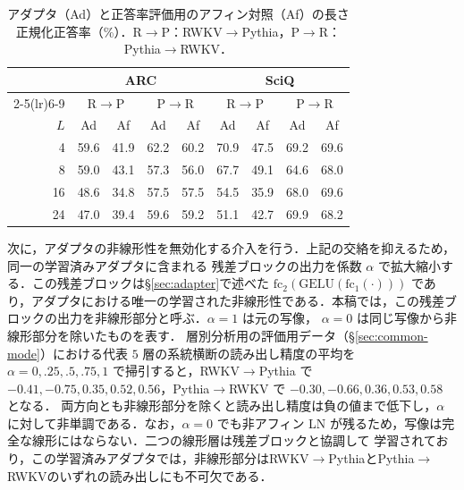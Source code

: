 \documentclass[techrep,noauthor]{ipsj}
\newcommand{\kw}[1]{#1}
\newcommand{\rev}[1]{{\color{blue}#1}}
\newcommand{\revp}[1]{{\color{violet}#1}}
\newcommand{\revy}[1]{{\color{revyellow}#1}}
\newcommand{\RtoP}{\textsf{RWKV$\to$\allowbreak Pythia}}
\newcommand{\PtoR}{\textsf{Pythia$\to$\allowbreak RWKV}}
\begin{document}
\begin{table}[!t]\centering\small
\caption{\rev{アダプタ（Ad）と正答率評価用のアフィン対照（Af）の長さ正規化正答率（\%）．R$\to$P：RWKV$\to$Pythia，P$\to$R：Pythia$\to$RWKV．}}\label{tab:bench}
\setlength{\tabcolsep}{2.4pt}
{\color{blue}
\begin{tabular}{rcccccccc}\toprule
& \multicolumn{4}{c}{\revp{ARC}} & \multicolumn{4}{c}{SciQ}\\
\cmidrule(lr){2-5}\cmidrule(lr){6-9}
& \multicolumn{2}{c}{\textsf{R$\to$P}} & \multicolumn{2}{c}{\textsf{P$\to$R}}
& \multicolumn{2}{c}{\textsf{R$\to$P}} & \multicolumn{2}{c}{\textsf{P$\to$R}}\\
$L$ & Ad & Af & Ad & Af & Ad & Af & Ad & Af\\\midrule
4  & 59.6 & 41.9 & 62.2 & 60.2 & 70.9 & 47.5 & 69.2 & 69.6\\
8  & 59.0 & 43.1 & 57.3 & 56.0 & 67.7 & 49.1 & 64.6 & 68.0\\
16 & 48.6 & 34.8 & 57.5 & 57.5 & 54.5 & 35.9 & 68.0 & 69.6\\
24 & 47.0 & 39.4 & 59.6 & 59.2 & 51.1 & 42.7 & 69.9 & 68.2\\\bottomrule
\end{tabular}}
\end{table}

\rev{次に，アダプタの非線形性を無効化する介入を行う．}上記の交絡を抑えるため，\kw{同一の学習済みアダプタ}に含まれる
残差ブロックの出力を係数 $\alpha$ で拡大縮小する．この残差ブロックは\revp{\S\ref{sec:adapter}で述べた}
$\mathrm{fc}_2(\mathrm{GELU}(\mathrm{fc}_1(\cdot)))$ であり，アダプタにおける唯一の学習された非線形性である．\rev{本稿では，この残差ブロックの出力を非線形部分と呼ぶ．}$\alpha{=}1$ は元の写像，
$\alpha{=}0$ は同じ写像から\rev{非線形部分}を除いたものを表す．
\revy{層別分析用の評価用データ（\S\ref{sec:common-mode}）における代表 $5$ 層の系統横断の読み出し精度の平均を $\alpha=0,.25,.5,.75,1$ で掃引すると，}\RtoP{} で
$-0.41,-0.75,0.35,0.52,0.56$，\PtoR{} で $-0.30,-0.66,0.36,0.53,0.58$ となる．
両方向とも\rev{非線形部分}を除くと\revp{読み出し精度}は負の値まで低下し，$\alpha$ に対して非単調である．\revp{なお，$\alpha{=}0$ でも非アフィン LN が残るため，写像は完全な線形にはならない．}二つの線形層は残差ブロックと協調して
学習されており，\kw{この学習済みアダプタでは，\rev{非線形部分}は\RtoP{}と\PtoR{}のいずれの読み出しにも不可欠}である．
\end{document}
